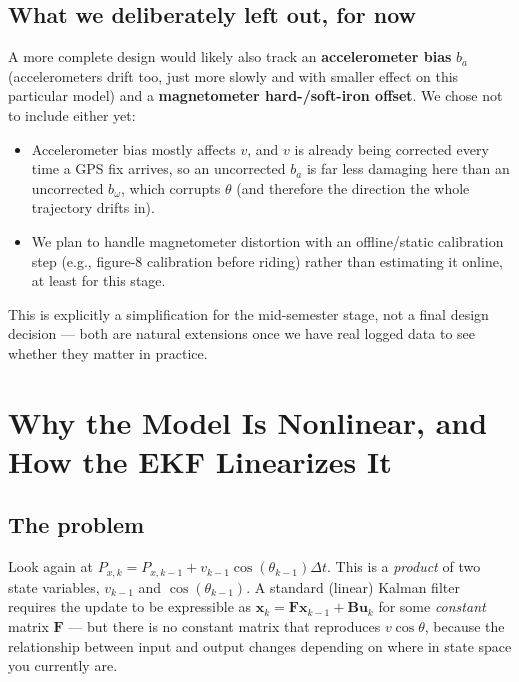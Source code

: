 \documentclass[11pt,a4paper]{article}
\begin{document}
\subsection*{What we deliberately left out, for now}
A more complete design would likely also track an \textbf{accelerometer bias} $b_a$ (accelerometers drift too, just more slowly and with smaller effect on this particular model) and a \textbf{magnetometer hard-/soft-iron offset}. We chose not to include either yet:
\begin{itemize}
    \item Accelerometer bias mostly affects $v$, and $v$ is already being corrected every time a GPS fix arrives, so an uncorrected $b_a$ is far less damaging here than an uncorrected $b_\omega$, which corrupts $\theta$ (and therefore the direction the whole trajectory drifts in).
    \item We plan to handle magnetometer distortion with an offline/static calibration step (e.g., figure-8 calibration before riding) rather than estimating it online, at least for this stage.
\end{itemize}
This is explicitly a simplification for the mid-semester stage, not a final design decision --- both are natural extensions once we have real logged data to see whether they matter in practice.

\section{Why the Model Is Nonlinear, and How the EKF Linearizes It}

\subsection{The problem}
Look again at $P_{x,k} = P_{x,k-1} + v_{k-1}\cos(\theta_{k-1})\Delta t$. This is a \emph{product} of two state variables, $v_{k-1}$ and $\cos(\theta_{k-1})$. A standard (linear) Kalman filter requires the update to be expressible as $\mathbf{x}_k = \mathbf{F}\mathbf{x}_{k-1} + \mathbf{B}\mathbf{u}_k$ for some \emph{constant} matrix $\mathbf{F}$ --- but there is no constant matrix that reproduces $v\cos\theta$, because the relationship between input and output changes depending on where in state space you currently are.
\end{document}

